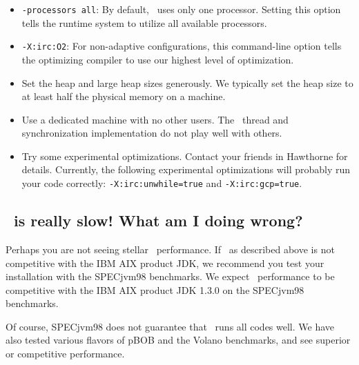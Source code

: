 \begin{itemize}
\item {\tt -processors all}: By default, \jp\ uses only one processor.  Setting this option tells the runtime system to utilize all available processors.
\item {\tt -X:irc:O2}: For non-adaptive configurations, this command-line option tells the optimizing compiler to use our highest level of optimization.
\item Set the heap and large heap sizes generously.  We typically set the heap size to at least half the physical memory on a machine.
\item Use a dedicated machine with no other users.  The \jp\ thread and synchronization implementation do not play well with others.
\item Try some experimental optimizations.  Contact your friends in Hawthorne
for details.  Currently, the following experimental optimizations will 
probably run your code correctly: {\tt -X:irc:unwhile=true} and {\tt -X:irc:gcp=true}.
\end{itemize}

\subsection{\jp\ is really slow! What am I doing wrong?}

Perhaps you are not seeing stellar \jp\ performance.  If \jp\ as described
above is not competitive with the IBM AIX product JDK, we recommend
you test your installation with the SPECjvm98 benchmarks.
We expect \jp\ performance to be competitive with the IBM AIX product JDK 1.3.0 on the SPECjvm98 benchmarks. 
%

Of course, SPECjvm98 does not guarantee that \jp\ runs all codes
well.  We have also tested various flavors of pBOB and the Volano
benchmarks, and see superior or competitive performance.

